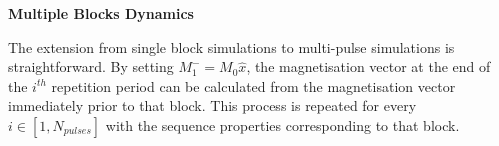 



\hfill

\large \textbf{Multiple Blocks Dynamics} \normalsize

The extension from single block simulations to multi-pulse simulations is straightforward.
By setting $M^{-}_1 = M_0 \hat{x}$,
the magnetisation vector at the end of the $i^{th}$ repetition period can be calculated from the magnetisation vector immediately prior to that block. 
This process is repeated for every $i \in [1, N_{pulses}]$ with the sequence properties corresponding to that block.

\hfill



